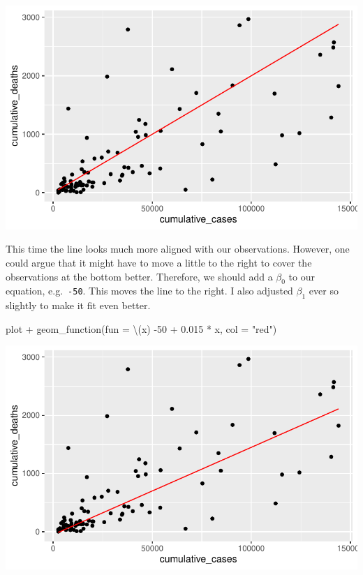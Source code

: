 \documentclass[
  letterpaper,
  DIV=11,
  numbers=noendperiod]{scrreprt}
\newenvironment{Shaded}{\begin{snugshade}}{\end{snugshade}}
\newcommand{\AttributeTok}[1]{\textcolor[rgb]{0.40,0.45,0.13}{#1}}
\newcommand{\DecValTok}[1]{\textcolor[rgb]{0.68,0.00,0.00}{#1}}
\newcommand{\FloatTok}[1]{\textcolor[rgb]{0.68,0.00,0.00}{#1}}
\newcommand{\FunctionTok}[1]{\textcolor[rgb]{0.28,0.35,0.67}{#1}}
\newcommand{\NormalTok}[1]{\textcolor[rgb]{0.00,0.23,0.31}{#1}}
\newcommand{\SpecialCharTok}[1]{\textcolor[rgb]{0.37,0.37,0.37}{#1}}
\newcommand{\StringTok}[1]{\textcolor[rgb]{0.13,0.47,0.30}{#1}}
\begin{document}
\includegraphics{13_regressions_files/figure-latex/fitting-model-by-hand-step-five-1.pdf}

This time the line looks much more aligned with our observations.
However, one could argue that it might have to move a little to the
right to cover the observations at the bottom better. Therefore, we
should add a \(\beta_0\) to our equation, e.g.~\texttt{-50}. This moves
the line to the right. I also adjusted \(\beta_1\) ever so slightly to
make it fit even better.

\begin{Shaded}
\begin{Highlighting}[]
\NormalTok{plot }\SpecialCharTok{+}
  \FunctionTok{geom\_function}\NormalTok{(}\AttributeTok{fun =}\NormalTok{ \textbackslash{}(x) }\SpecialCharTok{{-}}\DecValTok{50} \SpecialCharTok{+} \FloatTok{0.015} \SpecialCharTok{*}\NormalTok{ x, }\AttributeTok{col =} \StringTok{"red"}\NormalTok{)}
\end{Highlighting}
\end{Shaded}

\includegraphics{13_regressions_files/figure-latex/fitting-model-by-hand-step-six-1.pdf}
\end{document}
